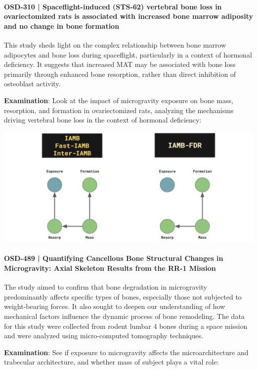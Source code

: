 \documentclass{article}
\begin{document}
\paragraph{OSD-310 | Spaceflight-induced (STS-62) vertebral bone loss in ovariectomized rats is associated with increased bone marrow adiposity and no change in bone formation}
This study sheds light on the complex relationship between bone marrow adipocytes and bone loss during spaceflight, particularly in a context of hormonal deficiency. It suggests that increased MAT may be associated with bone loss primarily through enhanced bone resorption, rather than direct inhibition of osteoblast activity.

\quad\quad\textbf{Examination}: Look at the impact of microgravity exposure on bone mass, resorption, and formation in ovariectomized rats, analyzing the mechanisms driving vertebral bone loss in the context of hormonal deficiency:

\includegraphics[width=\textwidth,height=\textheight,keepaspectratio]{OSD-310.png}

\paragraph{OSD-489 | Quantifying Cancellous Bone Structural Changes in Microgravity: Axial Skeleton Results from the RR-1 Mission}
The study aimed to confirm that bone degradation in microgravity predominantly affects specific types of bones, especially those not subjected to weight-bearing forces. It also sought to deepen our understanding of how mechanical factors influence the dynamic process of bone remodeling. The data for this study were collected from rodent lumbar 4 bones during a space mission and were analyzed using micro-computed tomography techniques.

\quad\quad\textbf{Examination}: See if exposure to microgravity affects the microarchitecture and trabecular architecture, and whether mass of subject plays a vital role:
\end{document}
